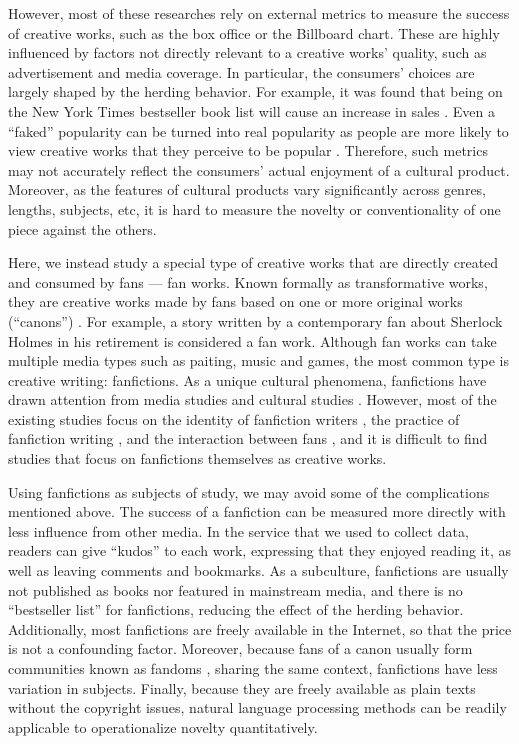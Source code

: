 \documentclass[letterpaper]{article} %
\begin{document}
However, most of these researches rely on external metrics to measure the success of creative works, such as the box office or  the Billboard chart. These are highly influenced by factors not directly relevant to a creative works' quality, such as advertisement and media coverage. In particular, the consumers' choices are largely shaped by the herding behavior. For example, it was found that being on the New York Times bestseller book list will cause an increase in sales \cite{sorensen2007bestseller}.  Even a ``faked'' popularity can be turned into real popularity as people are more likely to view creative works that they perceive to be popular \cite{salganik2008leading}. Therefore, such metrics may not accurately reflect the consumers' actual enjoyment of a cultural product. Moreover, as the features of cultural products vary significantly across genres, lengths, subjects, etc, it is hard to measure the novelty or conventionality of one piece against the others. 

Here, we instead study a special type of creative works that are directly created and consumed by fans --- fan works. Known formally as transformative works, they are creative works made by fans based on one or more original works (``canons'') \cite{wiki:transf_work}. For example, a story written by a contemporary fan about Sherlock Holmes in his retirement is considered a fan work. Although fan works can take multiple media types such as paiting, music and games, the most common type is creative writing: fanfictions. As a unique cultural phenomena, fanfictions have drawn attention from media studies and cultural studies \cite{thomas2011fanfiction}. However, most of the existing studies focus on the identity of fanfiction writers \cite{black2006language}, the practice of fanfiction writing \cite{LIT:LIT12061}, and the interaction between fans \cite{hills2015expertise}, and it is difficult to find studies that focus on fanfictions themselves as creative works.

Using fanfictions as subjects of study, we may avoid some of the complications mentioned above. The success of a fanfiction can be measured more directly with less influence from other media. In the service that we used to collect data, readers can give ``kudos'' to each work, expressing that they enjoyed reading it, as well as leaving comments and bookmarks. As a subculture, fanfictions are usually not published as books nor featured in mainstream media, and there is no ``bestseller list'' for fanfictions, reducing the effect of the herding behavior. Additionally, most fanfictions are freely available in the Internet, so that the price is not a confounding factor. Moreover, because fans of a canon usually form communities known as fandoms \cite{wiki:fandom}, sharing the same context, fanfictions have less variation in subjects. Finally, because they are freely available as plain texts without the copyright issues, natural language processing methods can be readily applicable to operationalize novelty quantitatively.
\end{document}
